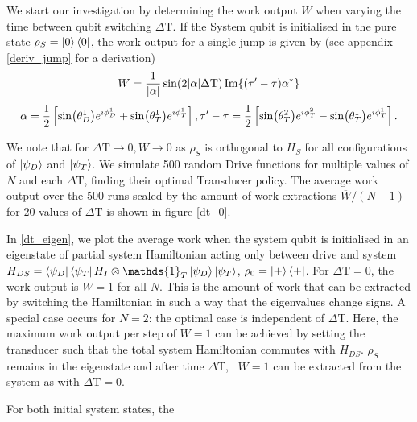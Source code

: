 We start our investigation by determining the work output $W$ when varying the time between qubit switching $\Delta \mathrm{T}$.
If the System qubit is initialised in the pure state $\rho_S = \ket{0} \bra{0}$, the work output for a single jump is given by (see appendix \ref{deriv_jump} for a derivation)
\begin{equation} \label{single_work}
	W = \frac{1}{\abs{\alpha}} \sin(2\abs{\alpha}\Delta \mathrm{T}) \Im{(\tau' - \tau) \alpha^*}
\end{equation}
\begin{equation*}
	\alpha = \frac{1}{2} \left[\sin(\theta_D^1) e^{i\phi_D^1} + \sin(\theta_T^1) e^{i\phi_T^1}\right], \\
	\tau' - \tau = \frac{1}{2} \left[ \sin(\theta_T^2)e^{i\phi_T^2} - \sin(\theta_T^1)e^{i\phi_T^1} \right].
\end{equation*}

We note that for $\Delta \mathrm{T} \to 0, W \to 0$ as $\rho_S$ is orthogonal to $H_S $ for all configurations of $\ket{\psi_D}$ and $ \ket{\psi_T}$.
We simulate 500 random Drive functions for multiple values of $N$ and each $\Delta \mathrm{T}$, finding their optimal Transducer policy. The average work output over the 500 runs scaled by the amount of work extractions $\overline{W}/(N-1)$ for 20 values of $\Delta \mathrm{T}$ is shown in figure \ref{dt_0}.

In \ref{dt_eigen}, we plot the average work when the system qubit is initialised in an eigenstate of partial system Hamiltonian acting only between drive and system $H_{DS} = \bra{\psi_D}\bra{\psi_T} H_I \otimes \mathds{1}_T \ket{\psi_D} \ket{\psi_T}$, $\rho_0 = \ket{+}\bra{+}$.
For $\Delta \mathrm{T} = 0$, the work output is $W = 1$ for all $N$. This is the amount of work that can be extracted by switching the Hamiltonian in such a way that the eigenvalues change signs.
A special case occurs for $N = 2$: the optimal case is independent of $\Delta \mathrm{T}$.
Here, the maximum work output per step of $W = 1$ can be achieved by setting the transducer such that the total system Hamiltonian commutes with $H_{DS}$. $\rho_S$ remains in the eigenstate and after time $\Delta \mathrm{T}$, \ $W = 1$ can be extracted from the system as with $\Delta \mathrm{T} = 0$.

For both initial system states, the 

